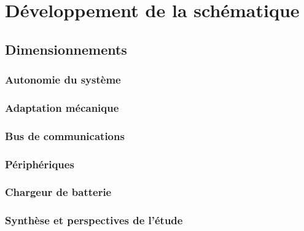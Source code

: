 \section{Développement de la schématique} \label{sec:Dev-Schematique}

\subsection{Dimensionnements} \label{ssec:Dev-Dimensionnements}

\subsubsection{Autonomie du système} \label{sssec:Autonomie-Systeme}

\subsubsection{Adaptation mécanique} \label{sssec:Adaptation-mech}

\subsubsection{Bus de communications} \label{sssec:Dev-BusComm}

\subsubsection{Périphériques} \label{sssec:Peripheriques}

\subsubsection{Chargeur de batterie} \label{sssec:Chargeur-bat}

\subsubsection{Synthèse et perspectives de l'étude} \label{sssec:Synth-etude}
